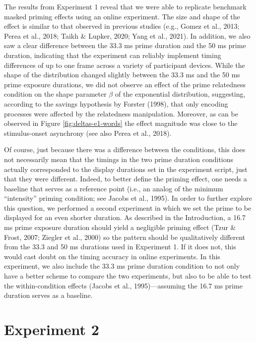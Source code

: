\documentclass[
  english,
  man,floatsintext]{apa6}
\begin{document}
The results from Experiment 1 reveal that we were able to replicate benchmark masked priming effects using an online experiment. The size and shape of the effect is similar to that observed in previous studies (e.g., Gomez et al., 2013; Perea et al., 2018; Taikh \& Lupker, 2020; Yang et al., 2021). In addition, we also saw a clear difference between the 33.3 ms prime duration and the 50 ms prime duration, indicating that the experiment can reliably implement timing differences of up to one frame across a variety of participant devices. While the shape of the distribution changed slightly between the 33.3 ms and the 50 ms prime exposure durations, we did not observe an effect of the prime relatedness condition on the shape parameter \(\beta\) of the exponential distribution, suggesting, according to the savings hypothesis by Forster (1998), that only encoding processes were affected by the relatedness manipulation. Moreover, as can be observed in Figure \ref{fig:deltas-e1-words} the effect magnitude was close to the stimulus-onset asynchrony (see also Perea et al., 2018).

Of course, just because there was a difference between the conditions, this does not necessarily mean that the timings in the two prime duration conditions actually corresponded to the display durations set in the experiment script, just that they were different. Indeed, to better define the priming effect, one needs a baseline that serves as a reference point (i.e., an analog of the minimum {``intensity''} priming condition; see Jacobs et al., 1995). In order to further explore this question, we performed a second experiment in which we set the prime to be displayed for an even shorter duration. As described in the Introduction, a 16.7 ms prime exposure duration should yield a negligible priming effect (Tzur \& Frost, 2007; Ziegler et al., 2000) so the pattern should be qualitatively different from the 33.3 and 50 ms durations used in Experiment 1. If it does not, this would cast doubt on the timing accuracy in online experiments. In this experiment, we also include the 33.3 ms prime duration condition to not only have a better scheme to compare the two experiments, but also to be able to test the within-condition effects (Jacobs et al., 1995)---assuming the 16.7 ms prime duration serves as a baseline.

\hypertarget{experiment-2}{%
\section{Experiment 2}\label{experiment-2}}
\end{document}
